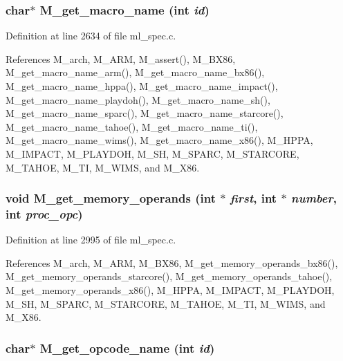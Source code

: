 \subsubsection{\setlength{\rightskip}{0pt plus 5cm}char$\ast$ M\_\-get\_\-macro\_\-name (int {\em id})}\label{ml__spec_8c_c91b78eb889c81a1d93c63a04086cb0f}




Definition at line 2634 of file ml\_\-spec.c.

References M\_\-arch, M\_\-ARM, M\_\-assert(), M\_\-BX86, M\_\-get\_\-macro\_\-name\_\-arm(), M\_\-get\_\-macro\_\-name\_\-bx86(), M\_\-get\_\-macro\_\-name\_\-hppa(), M\_\-get\_\-macro\_\-name\_\-impact(), M\_\-get\_\-macro\_\-name\_\-playdoh(), M\_\-get\_\-macro\_\-name\_\-sh(), M\_\-get\_\-macro\_\-name\_\-sparc(), M\_\-get\_\-macro\_\-name\_\-starcore(), M\_\-get\_\-macro\_\-name\_\-tahoe(), M\_\-get\_\-macro\_\-name\_\-ti(), M\_\-get\_\-macro\_\-name\_\-wims(), M\_\-get\_\-macro\_\-name\_\-x86(), M\_\-HPPA, M\_\-IMPACT, M\_\-PLAYDOH, M\_\-SH, M\_\-SPARC, M\_\-STARCORE, M\_\-TAHOE, M\_\-TI, M\_\-WIMS, and M\_\-X86.
\subsubsection{\setlength{\rightskip}{0pt plus 5cm}void M\_\-get\_\-memory\_\-operands (int $\ast$ {\em first}, int $\ast$ {\em number}, int {\em proc\_\-opc})}\label{ml__spec_8c_6f91704b640d5ed0bafdb2c023031e78}




Definition at line 2995 of file ml\_\-spec.c.

References M\_\-arch, M\_\-ARM, M\_\-BX86, M\_\-get\_\-memory\_\-operands\_\-bx86(), M\_\-get\_\-memory\_\-operands\_\-starcore(), M\_\-get\_\-memory\_\-operands\_\-tahoe(), M\_\-get\_\-memory\_\-operands\_\-x86(), M\_\-HPPA, M\_\-IMPACT, M\_\-PLAYDOH, M\_\-SH, M\_\-SPARC, M\_\-STARCORE, M\_\-TAHOE, M\_\-TI, M\_\-WIMS, and M\_\-X86.
\subsubsection{\setlength{\rightskip}{0pt plus 5cm}char$\ast$ M\_\-get\_\-opcode\_\-name (int {\em id})}\label{ml__spec_8c_89251420cce2259431ea72eb5826a914}





